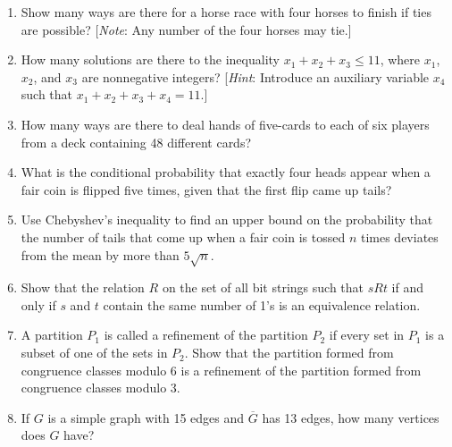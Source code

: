 \documentclass[letterpaper, 12pt]{article}
\begin{document}
\begin{enumerate}
    \item Show many ways are there for a horse race with four horses to finish if ties are possible? [\textit{Note}: Any number of the four horses may tie.]
    \item How many solutions are there to the inequality $x_1 + x_2 + x_3 \leq 11$, where $x_1$, $x_2$, and $x_3$ are nonnegative integers? [\textit{Hint}: Introduce an auxiliary variable $x_4$ such that $x_1 + x_2 + x_3 + x_4 = 11$.]
    \item How many ways are there to deal hands of five-cards to each of six players from a deck containing 48 different cards?
    \item What is the conditional probability that exactly four heads appear when a fair coin is flipped five times, given that the first flip came up tails?
    \item Use Chebyshev's inequality to find an upper bound on the probability that the number of tails that come up when a fair coin is tossed $n$ times deviates from the mean by more than $5\sqrt{n}$.
    \item Show that the relation $R$ on the set of all bit strings such that $sRt$ if and only if $s$ and $t$ contain the same number of 1's is an equivalence relation.
    \item A partition $P_1$ is called a refinement of the partition $P_2$ if every set in $P_1$ is a subset of one of the sets in $P_2$. Show that the partition formed from congruence classes modulo 6 is a refinement of the partition formed from congruence classes modulo 3.
    \item If $G$ is a simple graph with 15 edges and $\overline{G}$ has 13 edges, how many vertices does $G$ have?
\end{enumerate}
\end{document}
